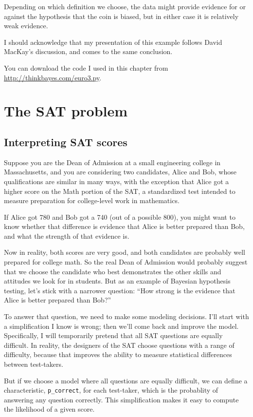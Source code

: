 \documentclass[12pt]{book}
\begin{document}
Depending on which definition we choose, the data might provide
evidence for or against the hypothesis that the coin is biased, but
in either case it is relatively weak evidence.

I should acknowledge that my presentation of this example follows
David MacKay's discussion, and comes to the same conclusion.

You can download the code I used in this chapter from
\url{http://thinkbayes.com/euro3.py}.


\chapter{The SAT problem}

\section{Interpreting SAT scores}

Suppose you are the Dean of Admission at a small engineering
college in Massachusetts, and you are considering two candidates,
Alice and Bob, whose qualifications are similar in many ways,
with the exception that Alice got a higher score on the Math
portion of the SAT, a standardized test intended to measure
preparation for college-level work in mathematics.

If Alice got 780 and Bob got a 740 (out of a possible 800), you might
want to know whether that difference is evidence that Alice is better
prepared than Bob, and what the strength of that evidence is.

Now in reality, both scores are very good, and both 
candidates are probably well prepared for college math.  So
the real Dean of Admission would probably suggest that we choose
the candidate who best demonstrates the other skills and
attitudes we look for in students.  But as an example of
Bayesian hypothesis testing, let's stick with a narrower question:
``How strong is the evidence that Alice is better prepared
than Bob?''

To answer that question, we need to make some modeling decisions.
I'll start with a simplification I know is wrong; then we'll come back
and improve the model.  Specifically, I will temporarily pretend that
all SAT questions are equally difficult.  In reality, the designers of
the SAT choose questions with a range of difficulty, because that
improves the ability to measure statistical differences between
test-takers.

But if we choose a model where all questions are equally difficult, we
can define a characteristic, \verb"p_correct", for each test-taker,
which is the probablity of answering any question correctly.  This
simplification makes it easy to compute the likelihood of a given
score.
\end{document}
